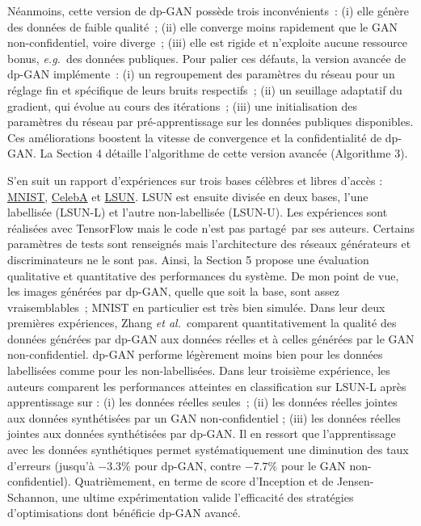 \documentclass[a4paper,11pt,twocolumn,twoside]{article}
\theoremstyle{definition}
\newcommand{\eg}{\textit{e.g.}}
\newcommand{\etal}{\textit{et al.}}
\begin{document}
Néanmoins, cette version de dp-GAN possède trois inconvénients : (i) elle génère des données de faible qualité ; (ii) elle converge moins rapidement que le GAN non-confidentiel, voire diverge ; (iii) elle est rigide et n'exploite aucune ressource bonus, \eg\ des données publiques. Pour palier ces défauts, la version avancée de dp-GAN implémente : (i) un regroupement des paramètres du réseau pour un réglage fin et spécifique de leurs bruits respectifs ; (ii) un seuillage adaptatif du gradient, qui évolue au cours des itérations ; (iii) une initialisation des paramètres du réseau par pré-apprentissage sur les données publiques disponibles. Ces améliorations boostent la vitesse de convergence et la confidentialité de dp-GAN. La Section 4 détaille l'algorithme de  cette version avancée (Algorithme 3).

S'en suit un rapport d'expériences sur trois bases célèbres et libres d'accès : \href{http://yann.lecun.com/exdb/mnist/}{MNIST}, \href{http://mmlab.ie.cuhk.edu.hk/projects/CelebA.html}{CelebA} et \href{http://lsun.cs.princeton.edu/2015.html}{LSUN}. LSUN est ensuite divisée en deux bases, l'une labellisée (LSUN-L) et l'autre non-labellisée (LSUN-U). Les expériences sont réalisées avec TensorFlow mais le code n'est pas partagé par ses auteurs. Certains paramètres de tests sont renseignés mais l'architecture des réseaux générateurs et discriminateurs ne le sont pas. Ainsi, la Section 5 propose une évaluation qualitative et quantitative des performances du système. De mon point de vue, les images générées par dp-GAN, quelle que soit la base, sont assez vraisemblables ; MNIST en particulier est très bien simulée.
Dans leur deux premières expériences, Zhang \etal\ comparent quantitativement la qualité des données générées par dp-GAN aux données réelles et à celles générées par le GAN non-confidentiel. dp-GAN performe légèrement moins bien pour les données labellisées comme pour les non-labellisées. Dans leur troisième expérience, les auteurs comparent les performances atteintes en classification sur LSUN-L après apprentissage sur : (i) les données réelles seules ; (ii) les données réelles jointes aux données synthétisées par un GAN non-confidentiel ; (iii) les données réelles jointes aux données synthétisées par dp-GAN. Il en ressort que l'apprentissage avec les données synthétiques permet systématiquement une diminution des taux d'erreurs (jusqu'à $-3.3 \%$ pour dp-GAN, contre $-7.7 \%$ pour le GAN non-confidentiel). Quatrièmement, en terme de score d'Inception et de Jensen-Schannon, une ultime expérimentation valide l'efficacité des stratégies d'optimisations dont bénéficie dp-GAN avancé.
\end{document}
